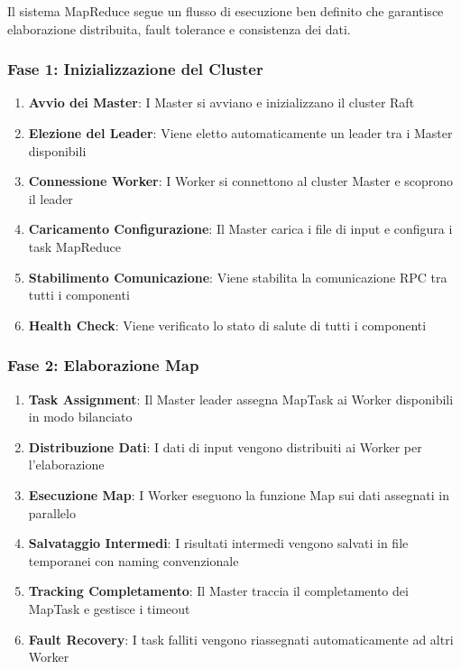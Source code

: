 \documentclass[12pt,a4paper]{article}
\begin{document}
Il sistema MapReduce segue un flusso di esecuzione ben definito che garantisce elaborazione distribuita, fault tolerance e consistenza dei dati.

\subsubsection{Fase 1: Inizializzazione del Cluster}

\begin{enumerate}
\item \textbf{Avvio dei Master}: I Master si avviano e inizializzano il cluster Raft
\item \textbf{Elezione del Leader}: Viene eletto automaticamente un leader tra i Master disponibili
\item \textbf{Connessione Worker}: I Worker si connettono al cluster Master e scoprono il leader
\item \textbf{Caricamento Configurazione}: Il Master carica i file di input e configura i task MapReduce
\item \textbf{Stabilimento Comunicazione}: Viene stabilita la comunicazione RPC tra tutti i componenti
\item \textbf{Health Check}: Viene verificato lo stato di salute di tutti i componenti
\end{enumerate}

\subsubsection{Fase 2: Elaborazione Map}

\begin{enumerate}
\item \textbf{Task Assignment}: Il Master leader assegna MapTask ai Worker disponibili in modo bilanciato
\item \textbf{Distribuzione Dati}: I dati di input vengono distribuiti ai Worker per l'elaborazione
\item \textbf{Esecuzione Map}: I Worker eseguono la funzione Map sui dati assegnati in parallelo
\item \textbf{Salvataggio Intermedi}: I risultati intermedi vengono salvati in file temporanei con naming convenzionale
\item \textbf{Tracking Completamento}: Il Master traccia il completamento dei MapTask e gestisce i timeout
\item \textbf{Fault Recovery}: I task falliti vengono riassegnati automaticamente ad altri Worker
\end{enumerate}
\end{document}
